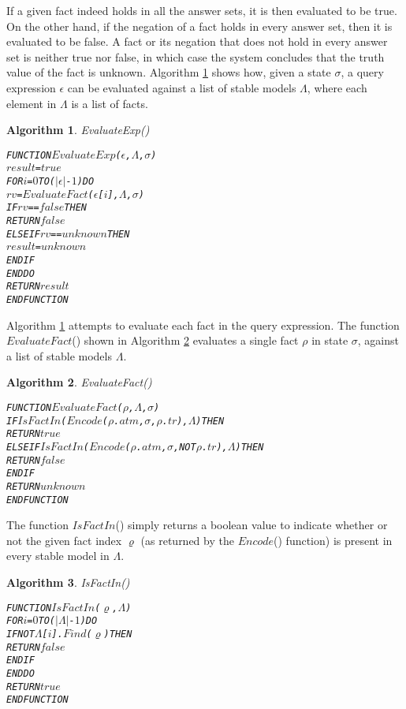 \documentclass[11pt]{report}
\newenvironment{vverbatim}
{
  \begin{alltt}
}
{
    \vspace{-\baselineskip}
  \end{alltt}
}
\newtheorem{vvalgorithm}{Algorithm}[chapter]
\newenvironment{valgorithm}[2]
{
  \begin{vvalgorithm}{#1}
    \label{#2}
    \small
    \begin{vverbatim}
}
{
    \end{vverbatim}
  \end{vvalgorithm}
}
\begin{document}

        If a given fact indeed holds in all the answer sets, it is then
        evaluated to be true. On the other hand, if the negation of a fact
        holds in every answer set, then it is evaluated to be false. A fact
        or its negation that does not hold in every answer set is neither true
        nor false, in which case the system concludes that the truth value of
        the fact is unknown. Algorithm \ref{algo-polup-evale} shows how, given
        a state $\sigma$, a query expression $\epsilon$ can be evaluated
        against a list of stable models $\Lambda$, where each element in
        $\Lambda$ is a list of facts.

        \begin{valgorithm}{EvaluateExp()}{algo-polup-evale}
FUNCTION \(EvaluateExp\)(\(\epsilon\), \(\Lambda\), \(\sigma\))
  \(result\) = \(true\)
  FOR \(i\) = \(0\) TO (\(|\epsilon|\) - \(1\)) DO
    \(rv\) = \(EvaluateFact\)(\(\epsilon\)[\(i\)], \(\Lambda\), \(\sigma\))
    IF \(rv\) == \(false\) THEN
      RETURN \(false\)
    ELSE IF \(rv\) == \(unknown\) THEN
      \(result\) = \(unknown\)
    ENDIF
  ENDDO
  RETURN \(result\)
ENDFUNCTION
        \end{valgorithm}

        Algorithm \ref{algo-polup-evale} attempts to evaluate each fact in the
        query expression. The function $EvaluateFact$() shown in Algorithm
        \ref{algo-polup-evalf} evaluates a single fact $\rho$ in state
        $\sigma$, against a list of stable models $\Lambda$.

        \begin{valgorithm}{EvaluateFact()}{algo-polup-evalf}
FUNCTION \(EvaluateFact\)(\(\rho\), \(\Lambda\), \(\sigma\))
  IF \(IsFactIn\)(\(Encode\)(\(\rho\).\(atm\), \(\sigma\), \(\rho\).\(tr\)), \(\Lambda\)) THEN
    RETURN \(true\)
  ELSE IF \(IsFactIn\)(\(Encode\)(\(\rho\).\(atm\), \(\sigma\), NOT \(\rho\).\(tr\)), \(\Lambda\)) THEN
    RETURN \(false\)
  ENDIF
  RETURN \(unknown\)
ENDFUNCTION
        \end{valgorithm}

        The function $IsFactIn$() simply returns a boolean value to
        indicate whether or not the given fact index $\varrho$ (as returned
        by the $Encode$() function) is present in every stable model in
        $\Lambda$.

        \begin{valgorithm}{IsFactIn()}{algo-polup-isinf}
FUNCTION \(IsFactIn\)(\(\varrho\), \(\Lambda\))
  FOR \(i\) = \(0\) TO (\(|\Lambda|\) - \(1\)) DO
    IF NOT \(\Lambda\)[\(i\)].\(Find\)(\(\varrho\)) THEN
      RETURN \(false\)
    ENDIF
  ENDDO
  RETURN \(true\)
ENDFUNCTION
        \end{valgorithm}
\end{document}
